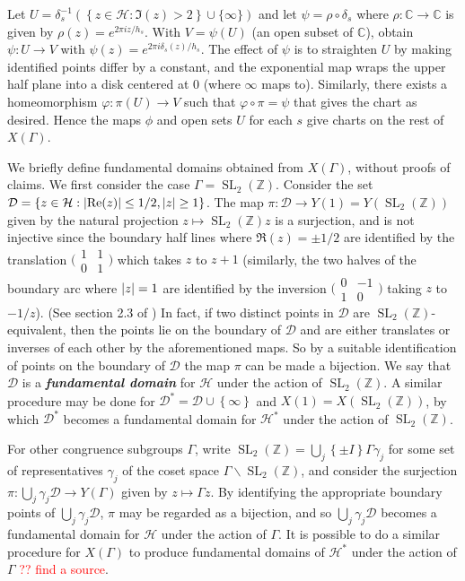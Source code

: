 \documentclass[10pt,leqno,twoside]{article}
\theoremstyle{plain}
\theoremstyle{definition}
\numberwithin{equation}{section}
\numberwithin{lem}{section}
\newcommand{\cbr}[1]{\left\{#1\right\}}
\newcommand{\textib}[1]{\textbf{\textit{#1\index{#1}}}} %
\DeclareMathOperator{\SL}{SL}
\newcommand{\slz}{\SL_2(\mathbb{Z})}
\newcommand{\sai}[1]{\textcolor{red}{#1}}
\begin{document}
Let $U = \delta_s^{-1}(\cbr{z\in\mathcal H : \Im(z) > 2}\cup\{\infty\})$ and let $\psi = \rho\circ \delta_s$ where $\rho\colon \mathbb C\to\mathbb C$ is given by $\rho(z) = e^{2\pi i z/h_s}$. With $V = \psi(U)$ (an open subset of $\mathbb C$), obtain $\psi\colon U\to V$ with $\psi(z) = e^{2\pi i \delta_s(z)/h_s}$. The effect of $\psi$ is to straighten $U$ by making identified points differ by a constant, and the exponential map wraps the upper half plane into a disk centered at $0$ (where $\infty$ maps to). Similarly, there exists a homeomorphism $\varphi\colon \pi(U)\to V$ such that $\varphi\circ\pi = \psi$ that gives the chart as desired. Hence the maps $\phi$ and open sets $U$ for each $s$ give charts on the rest of $X(\varGamma)$.

We briefly define fundamental domains obtained from $X(\varGamma)$, without proofs of claims. We first consider the case $\varGamma = \slz$. Consider the set $\mathcal D = \cbr{z\in\mathcal H : \abs{\Re(z)}\leq 1/2,\abs{z}\geq 1}$. The map $\pi\colon\mathcal D\to Y(1) = Y(\slz)$ given by the natural projection $z\mapsto \slz z$ is a surjection, and is not injective since the boundary half lines where $\Re(z) = \pm 1/2$ are identified by the translation $\big(\!\begin{smallmatrix}
    1 & 1 \\ 0 & 1
\end{smallmatrix}\!\big)$ which takes $z$ to $z+1$ (similarly, the two halves of the boundary arc where $\abs{z} = 1$ are identified by the inversion $\big(\!\begin{smallmatrix}
    0 & -1 \\ 1 & 0
\end{smallmatrix}\!\big)$ taking $z$ to $-1/z$). (See section 2.3 of \cite{diamond}) In fact, if two distinct points in $\mathcal D$ are $\slz$-equivalent, then the points lie on the boundary of $\mathcal D$ and are either translates or inverses of each other by the aforementioned maps. So by a suitable identification of points on the boundary of $\mathcal D$ the map $\pi$ can be made a bijection. We say that $\mathcal D$ is a \textib{fundamental domain} for $\mathcal H$ under the action of $\slz$. A similar procedure may be done for $\mathcal D^\ast = \mathcal D \cup\cbr{\infty}$ and $X(1) = X(\slz)$, by which $\mathcal D^\ast$ becomes a fundamental domain for $\mathcal H^\ast$ under the action of $\slz$. 

For other congruence subgroups $\varGamma$, write $\slz = \bigcup_j \cbr{\pm I}\varGamma \gamma_j$ for some set of representatives $\gamma_j$ of the coset space $\varGamma\backslash \slz$, and consider the surjection $\pi\colon \bigcup_j \gamma_j\mathcal D\to Y(\varGamma)$ given by $z\mapsto \varGamma z$. By identifying the appropriate boundary points of $\bigcup_j \gamma_j\mathcal D$, $\pi$ may be regarded as a bijection, and so $\bigcup_j \gamma_j\mathcal D$ becomes a fundamental domain for $\mathcal H$ under the action of $\varGamma$. It is possible to do a similar procedure for $X(\varGamma)$ to produce fundamental domains of $\mathcal H^\ast$ under the action of $\varGamma$ \sai{?? find a source}. 
\end{document}
